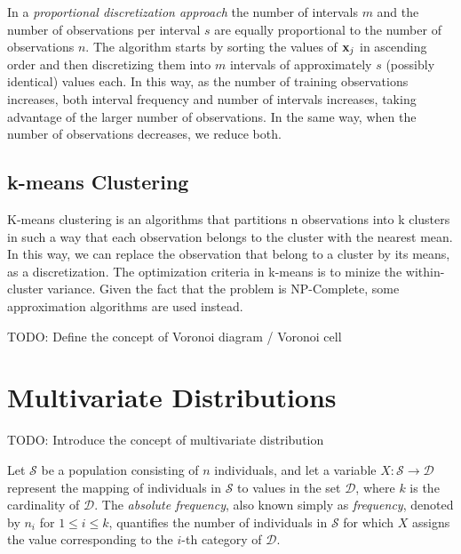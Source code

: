 In a \emph{proportional discretization approach} the number of intervals $m$ and the number of observations per interval $s$ are equally proportional to the number of observations $n$. The algorithm starts by sorting the values of $\bold{x}_j$ in ascending order and then discretizing them into $m$ intervals of approximately $s$ (possibly identical) values each. In this way, as the number of training observations increases, both interval frequency and number of intervals increases, taking advantage of the larger number of observations. In the same way, when the number of observations decreases, we reduce both.

\subsection{k-means Clustering}
\label{sec:kmeans_clustering}

K-means clustering is an algorithms that partitions n observations into k clusters in such a way that each observation belongs to the cluster with the nearest mean. In this way, we can replace the observation that belong to a cluster by its means, as a discretization. The optimization criteria in k-means is to minize the within-cluster variance. Given the fact that the problem is NP-Complete, some approximation algorithms are used instead.

{\color{red} TODO: Define the concept of Voronoi diagram / Voronoi cell}


%
%

\section{Multivariate Distributions}
\label{sec:multivariate_distributions}

{\color{red} TODO: Introduce the concept of multivariate distribution}

\begin{definition}
Let $\mathcal{S}$ be a population consisting of $n$ individuals, and let a variable $X: \mathcal{S} \rightarrow \mathcal{D}$ represent the mapping of individuals in $\mathcal{S}$ to values in the set $\mathcal{D}$, where $k$ is the cardinality of $\mathcal{D}$. The \emph{absolute frequency}, also known simply as \emph{frequency}, denoted by $n_i$ for $1 \leq i \leq k$, quantifies the number of individuals in $\mathcal{S}$ for which $X$ assigns the value corresponding to the $i$-th category of $\mathcal{D}$.
\end{definition}

